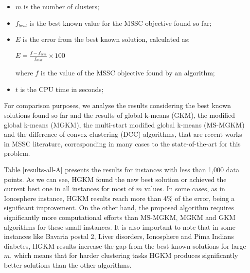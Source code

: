 \begin{itemize}

	\item $m$ is the number of clusters;

	\item $f_{best}$ is the best known value for the MSSC objective found so far;

	\item $E$ is the error from the best known solution, calculated as:

		\begin{center}
		\large
			$E = \frac{f - f_{best}}{f_{best}} \times 100$
		\end{center}
		
	where $f$ is the value of the MSSC objective found by an algorithm;
	
	\item $t$ is the CPU time in seconds;


\end{itemize}

For comparison purposes, we analyse the results considering the best known solutions found so far and the results of global k-means (GKM), the modified global k-means (MGKM), the multi-start modified global k-means (MS-MGKM) and the difference of convex clustering (DCC) algorithms, that are recent works in MSSC literature, corresponding in many cases to the state-of-the-art for this problem.







Table \ref{results-all-A} presents the results for instances with less than 1,000 data points. As we can see, HGKM found the new best solution or achieved the current best one in all instances for most of $m$ values. In some cases, as in Ionosphere instance, HGKM results reach more than 4\% of the error, being a significant improvement. On the other hand, the proposed algorithm requires significantly more computational efforts than MS-MGKM, MGKM and GKM algorithms for these small instances. It is also important to note that in some instances like Bavaria postal 2, Liver disorders, Ionosphere and Pima Indians diabetes, HGKM results increase the gap from the best known solutions for large $m$, which means that for harder clustering tasks HGKM produces significantly better solutions than the other algorithms.

